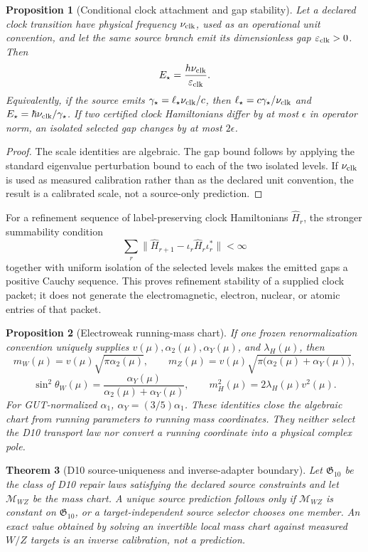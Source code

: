 \documentclass[11pt]{article}
\newtheorem{theorem}{Theorem}[section]
\newtheorem{proposition}[theorem]{Proposition}
\begin{document}
\begin{proposition}[Conditional clock attachment and gap stability]
Let a declared clock transition have physical frequency \(\nu_{\rm clk}\),
used as an operational unit convention, and let the same source branch emit
its dimensionless gap \(\varepsilon_{\rm clk}>0\).  Then
\[
E_\star=\frac{h\nu_{\rm clk}}{\varepsilon_{\rm clk}}.
\]
Equivalently, if the source emits
\(\gamma_\star=\ell_\star\nu_{\rm clk}/c\), then
\(\ell_\star=c\gamma_\star/\nu_{\rm clk}\) and
\(E_\star=\hbar\nu_{\rm clk}/\gamma_\star\).  If two certified clock
Hamiltonians differ by at most \(\epsilon\) in operator norm, an isolated
selected gap changes by at most \(2\epsilon\).
\end{proposition}

\begin{proof}
The scale identities are algebraic.  The gap bound follows by applying the
standard eigenvalue perturbation bound to each of the two isolated levels.
If \(\nu_{\rm clk}\) is used as measured calibration rather than as the
declared unit convention, the result is a calibrated scale, not a source-only
prediction.
\end{proof}

For a refinement sequence of label-preserving clock Hamiltonians
\(\widehat H_r\), the stronger summability condition
\[
 \sum_r\|\widehat H_{r+1}-\iota_r\widehat H_r\iota_r^*\|<\infty
\]
together with uniform isolation of the selected levels makes the emitted gaps
a positive Cauchy sequence. This proves refinement stability of a supplied
clock packet; it does not generate the electromagnetic, electron, nuclear, or
atomic entries of that packet.

\begin{proposition}[Electroweak running-mass chart]
If one frozen renormalization convention uniquely supplies
\(v(\mu),\alpha_2(\mu),\alpha_Y(\mu)\), and \(\lambda_H(\mu)\), then
\[
m_W(\mu)=v(\mu)\sqrt{\pi\alpha_2(\mu)},
\qquad
m_Z(\mu)=v(\mu)\sqrt{\pi\bigl(\alpha_2(\mu)+\alpha_Y(\mu)\bigr)},
\]
\[
\sin^2\theta_W(\mu)=
\frac{\alpha_Y(\mu)}{\alpha_2(\mu)+\alpha_Y(\mu)},
\qquad
m_H^2(\mu)=2\lambda_H(\mu)v^2(\mu).
\]
For GUT-normalized \(\alpha_1\), \(\alpha_Y=(3/5)\alpha_1\).
These identities close the algebraic chart from running parameters to running
mass coordinates.  They neither select the D10 transport law nor convert a
running coordinate into a physical complex pole.
\end{proposition}

\begin{theorem}[D10 source-uniqueness and inverse-adapter boundary]
Let \(\mathfrak G_{10}\) be the class of D10 repair laws satisfying the
declared source constraints and let \(\mathcal M_{WZ}\) be the mass chart.  A
unique source prediction follows only if \(\mathcal M_{WZ}\) is constant on
\(\mathfrak G_{10}\), or a target-independent source selector chooses one
member.  An exact value obtained by solving an invertible local mass chart
against measured \(W/Z\) targets is an inverse calibration, not a prediction.
\end{theorem}
\end{document}

